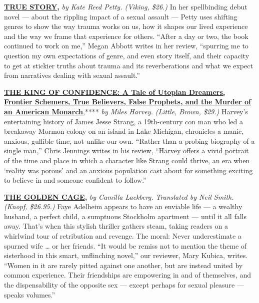 \href{https://www.nytimes.com/2020/07/24/books/review/kate-reed-petty-true-story.html}{\textbf{\textbf{TRUE
STORY}}}\textbf{\textbf{,}} \emph{by Kate Reed Petty. (Viking, \$26.)}
In her spellbinding debut novel --- about the rippling impact of a
sexual assault --- Petty uses shifting genres to show the way trauma
works on us, how it shapes our lived experience and the way we frame
that experience for others. ``After a day or two, the book continued to
work on me,'' Megan Abbott writes in her review, ``spurring me to
question my own expectations of genre, and even story itself, and their
capacity to get at stickier truths about trauma and its reverberations
and what we expect from narratives dealing with sexual assault.''

\textbf{\href{https://www.nytimes.com/2020/07/14/books/review/king-of-confidence-miles-harvey-james-jesse-strang.html}{\textbf{THE
KING OF CONFIDENCE: A Tale of Utopian Dreamers, Frontier Schemers, True
Believers, False Prophets, and the Murder of an American Monarch}}},****
\emph{by Miles Harvey. (Little, Brown, \$29.)} Harvey's entertaining
history of James Jesse Strang, a 19th-century con man who led a
breakaway Mormon colony on an island in Lake Michigan, chronicles a
manic, anxious, gullible time, not unlike our own. ``Rather than a
probing biography of a single man,'' Chris Jennings writes in his
review, ``Harvey offers a vivid portrait of the time and place in which
a character like Strang could thrive, an era when `reality was porous'
and an anxious population cast about for something exciting to believe
in and someone confident to follow.''

\href{https://www.nytimes.com/2020/07/07/books/review/the-golden-cage-camilla-lackberg.html}{\textbf{\textbf{THE
GOLDEN CAGE}}}\textbf{\textbf{,}} \emph{by Camilla Lackberg. Translated
by Neil Smith. (Knopf, \$26.95.)} Faye Adelheim appears to have an
enviable life --- a wealthy husband, a perfect child, a sumptuous
Stockholm apartment --- until it all falls away. That's when this
stylish thriller gathers steam, taking readers on a whirlwind tour of
retribution and revenge. The moral: Never underestimate a spurned wife
\ldots{} or her friends. ``It would be remiss not to mention the theme
of sisterhood in this smart, unflinching novel,'' our reviewer, Mary
Kubica, writes. ``Women in it are rarely pitted against one another, but
are instead united by common experience. Their friendships are
empowering in and of themselves, and the dispensability of the opposite
sex --- except perhaps for sexual pleasure --- speaks volumes.''

